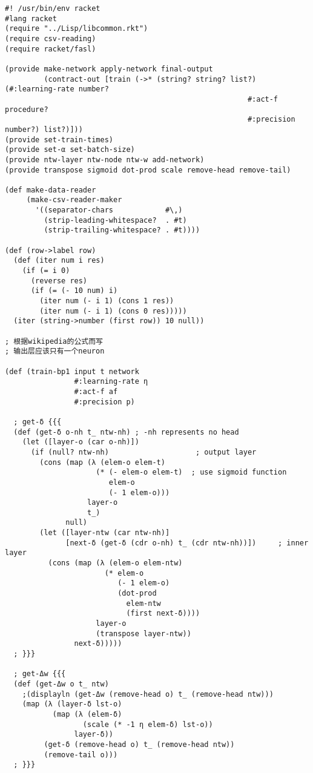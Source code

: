 \documentclass{article}
\begin{document}
  \lstset{language=Racket}
  \begin{lstlisting}
#! /usr/bin/env racket
#lang racket
(require "../Lisp/libcommon.rkt")
(require csv-reading)
(require racket/fasl)

(provide make-network apply-network final-output
         (contract-out [train (->* (string? string? list?) (#:learning-rate number?
                                                        #:act-f procedure?
                                                        #:precision number?) list?)]))
(provide set-train-times)
(provide set-α set-batch-size)
(provide ntw-layer ntw-node ntw-w add-network)
(provide transpose sigmoid dot-prod scale remove-head remove-tail)

(def make-data-reader
     (make-csv-reader-maker
       '((separator-chars            #\,)
         (strip-leading-whitespace?  . #t)
         (strip-trailing-whitespace? . #t))))

(def (row->label row)
  (def (iter num i res)
    (if (= i 0)
      (reverse res)
      (if (= (- 10 num) i)
        (iter num (- i 1) (cons 1 res))
        (iter num (- i 1) (cons 0 res)))))
  (iter (string->number (first row)) 10 null))

; 根据wikipedia的公式而写
; 输出层应该只有一个neuron

(def (train-bp1 input t network
                #:learning-rate η
                #:act-f af
                #:precision p)

  ; get-δ {{{
  (def (get-δ o-nh t_ ntw-nh) ; -nh represents no head
    (let ([layer-o (car o-nh)])
      (if (null? ntw-nh)                    ; output layer
        (cons (map (λ (elem-o elem-t)
                     (* (- elem-o elem-t)  ; use sigmoid function
                        elem-o
                        (- 1 elem-o)))
                   layer-o
                   t_)
              null)
        (let ([layer-ntw (car ntw-nh)]
              [next-δ (get-δ (cdr o-nh) t_ (cdr ntw-nh))])     ; inner layer
          (cons (map (λ (elem-o elem-ntw)
                       (* elem-o
                          (- 1 elem-o)
                          (dot-prod
                            elem-ntw
                            (first next-δ))))
                     layer-o
                     (transpose layer-ntw))
                next-δ)))))
  ; }}}

  ; get-Δw {{{
  (def (get-Δw o t_ ntw)
    ;(displayln (get-Δw (remove-head o) t_ (remove-head ntw)))
    (map (λ (layer-δ lst-o)
           (map (λ (elem-δ)
                  (scale (* -1 η elem-δ) lst-o))
                layer-δ))
         (get-δ (remove-head o) t_ (remove-head ntw))
         (remove-tail o)))
  ; }}}


\end{lstlisting}
\end{document}
